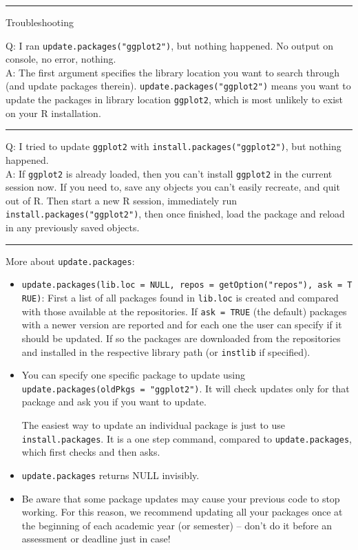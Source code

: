 \documentclass[
]{book}
\begin{document}
\begin{center}\rule{0.5\linewidth}{0.5pt}\end{center}

{Troubleshooting}

Q: I ran \texttt{update.packages("ggplot2")}, but nothing happened. No output on console, no error, nothing.\\
A: The first argument specifies the library location you want to search through (and update packages therein). \texttt{update.packages("ggplot2")} means you want to update the packages in library location \texttt{ggplot2}, which is most {unlikely} to exist on your R installation.

\begin{center}\rule{0.5\linewidth}{0.5pt}\end{center}

Q: I tried to update \texttt{ggplot2} with \texttt{install.packages("ggplot2")}, but nothing happened.\\
A: {If \texttt{ggplot2} is already loaded}, then you can't install \texttt{ggplot2} in the current session now. If you need to, save any objects you can't easily recreate, and quit out of R. Then start a new R session, immediately run \texttt{install.packages("ggplot2")}, then once finished, load the package and reload in any previously saved objects.

\begin{center}\rule{0.5\linewidth}{0.5pt}\end{center}

More about \texttt{update.packages}:

\begin{itemize}
\item
  \texttt{update.packages(lib.loc\ =\ NULL,\ repos\ =\ getOption("repos"),\ ask\ =\ TRUE)}: First a list of all packages found in \texttt{lib.loc} is created and compared with those available at the repositories. If \texttt{ask\ =\ TRUE} (the default) packages with a newer version are reported and for each one the user can specify if it should be updated. If so the packages are downloaded from the repositories and installed in the respective library path (or \texttt{instlib} if specified).
\item
  You can specify one specific package to update using \texttt{update.packages(oldPkgs\ =\ "ggplot2")}. It will check updates only for that package and ask you if you want to update.

  The easiest way to update an individual package is just to use \texttt{install.packages}. It is a one step command, compared to \texttt{update.packages}, which first checks and then asks.
\item
  \texttt{update.packages} returns NULL invisibly.
\item
  Be aware that some package updates may cause your previous code to stop working. For this reason, we recommend updating all your packages once at the beginning of each academic year (or semester) -- don't do it before an assessment or deadline just in case!
\end{itemize}
\end{document}
